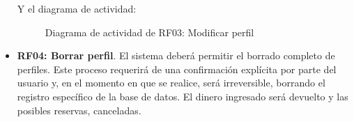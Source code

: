 \begin{itemize}
	Y el diagrama de actividad:
	\begin{figure}[!htb]
		\centering
		\caption{Diagrama de actividad de RF03: Modificar perfil}
		\label{fig:diagramaActividad_RF03}
	\end{figure}
	
	\FloatBarrier
	\item \textbf{RF04: Borrar perfil}. El sistema deberá permitir el borrado completo de perfiles. Este proceso requerirá de una confirmación explícita por parte del usuario y, en el momento en que se realice, será irreversible, borrando el registro específico de la base de datos. El dinero ingresado será devuelto y las posibles reservas, canceladas.
	

\end{itemize}
